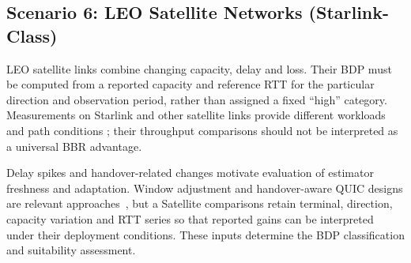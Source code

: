 \documentclass[a4paper,fleqn]{cas-sc}
\begin{document}
\subsection{Scenario 6: LEO Satellite Networks (Starlink-Class)}
\label{sec:leo}

LEO satellite links combine changing capacity, delay and loss. Their BDP
must be computed from a reported capacity and reference RTT for the
particular direction and observation period, rather than assigned a fixed
``high'' category. Measurements on Starlink and other satellite links
provide different workloads and path conditions
\citep{deutschmann2023starlink,claypool2021satellite}; their throughput
comparisons should not be interpreted as a universal BBR advantage.

Delay spikes and handover-related changes motivate evaluation of estimator
freshness and adaptation. Window adjustment and handover-aware QUIC designs
are relevant approaches~\citep{wang2024bbr_leo,kamel2024starquic}, but a
Satellite comparisons retain terminal, direction, capacity variation and RTT
series so that reported gains can be interpreted under their deployment
conditions. These inputs determine the BDP classification and suitability
assessment.
\end{document}
